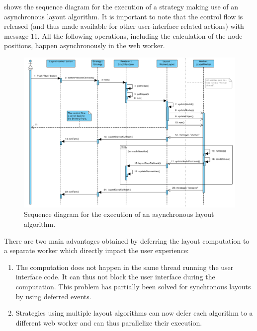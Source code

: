  shows the sequence diagram for the execution of a strategy making use of an asynchronous layout algorithm. It is important to note that the control flow is released (and thus made available for other user-interface related actions) with message 11. All the following operations, including the calculation of the node positions, happen asynchronously in the web worker. 

\begin{figure}[t]
  \begin{adjustwidth}{-4.6mm}{-2.5cm}  
  \includegraphics[width=\linewidth]{images/diagrams/seq-execute-layout}
\end{adjustwidth}
  \caption[Sequence diagram for the execution of an asynchronous layout.]{Sequence diagram for the execution of an asynchronous layout algorithm.}
  \label{fig:seq-execute-layout}
\end{figure}

There are two main advantages obtained by deferring the layout computation to a separate worker which directly impact the user experience:

\begin{enumerate}
  \item The computation does not happen in the same thread running the user interface code. It can thus not block the user interface during the computation. This problem has partially been solved for synchronous layouts by using deferred events.
  \item Strategies using multiple layout algorithms can now defer each algorithm to a different web worker and can thus parallelize their execution.
\end{enumerate}

